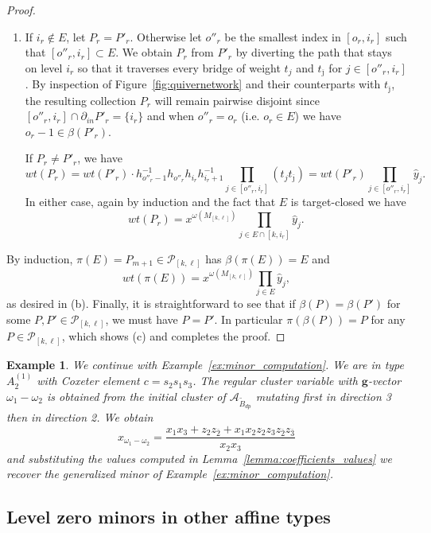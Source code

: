 \documentclass[12pt]{amsart}
\newcommand{\cA}{\mathcal{A}}
\newcommand{\bfg}{\mathbf{g}}
\newcommand{\gv}{\omega}
\newcommand{\grep}{\gv}
\newcommand{\cP}{\mathcal{P}}
\newcommand{\ol}[1]{\overline{#1}}
\newcommand{\Bdp}{\widetilde{B}_{dp}}
\newcommand{\Qrep}{M}
\newcommand{\cvar}{z}
\newtheorem{example}[theorem]{Example}
\theoremstyle{remark}
\numberwithin{equation}{section}
\numberwithin{figure}{section}
\begin{document}
\begin{proof}
\begin{enumerate}
    \item
      If $i_r \notin E$, let $P_r = P'_r$.
      Otherwise let $o''_r$ be the smallest index in $[o_r,i_r]$ such that $[o''_r,i_r]\subset E$.
      We obtain $P_r$ from $P'_r$ by diverting the path that stays on level $i_r$ so that it traverses every bridge of weight $t_j$ and $t_{\ol{\jmath}}$ for $j\in[o''_r,i_r]$.
      By inspection of Figure~\ref{fig:quivernetwork} and their counterparts with $t_{\ol{\jmath}}$, the resulting collection $P_r$ will remain pairwise disjoint since $[o''_r,i_r]\cap\partial_{in}P'_r=\{i_r\}$ and when $o''_r=o_r$ (i.e. $o_r\in E$) we have $o_r-1\in\beta(P'_r)$.

      If $P_r \neq P'_r$, we have
      \[
        wt(P_r)=wt(P'_r)\cdot h_{o''_r-1}^{-1}h_{o''_r}h_{i_r}h_{i_r+1}^{-1}\prod_{j\in[o''_r,i_r]}(t_jt_{\ol{\jmath}})=wt(P'_r)\prod_{j \in [o''_r,i_r]} \hat{y}_j.
      \]
      In either case, again by induction and the fact that $E$ is target-closed we have
      \[
        wt(P_r) = x^{\grep(\Qrep_{[k,\ell]})} \prod_{j \in E \cap [k,i_r]} \hat{y}_j.
      \]
  \end{enumerate}
  By induction, $\pi(E)=P_{m+1} \in \cP_{[k,\ell]}$ has $\beta(\pi(E))=E$ and
  \[
    wt(\pi(E))=x^{\grep(\Qrep_{[k,\ell]})}\prod_{j\in E}\hat y_j,
  \]
  as desired in (b).
  Finally, it is straightforward to see that if $\beta(P) = \beta(P')$ for some $P, P' \in \cP_{[k,\ell]}$, we must have $P = P'$.
  In particular $\pi(\beta(P))=P$ for any $P\in\cP_{[k,\ell]}$, which shows (c) and completes the proof.
\end{proof}
\begin{example}
  We continue with Example~\ref{ex:minor_computation}.
  We are in type $A_2^{(1)}$ with Coxeter element $c=s_2s_1s_3$.
  The regular cluster variable with $\bfg$-vector $\omega_1-\omega_2$ is obtained from the initial cluster of $\cA_{\Bdp}$ mutating first in direction 3 then in direction 2.
  We obtain
  \[
    x_{\omega_1-\omega_2} 
    =
    \frac{x_1 x_3 + \cvar_2 \cvar_{\ol{2}} + x_1 x_2 \cvar_2 \cvar_3 \cvar_{\ol{2}} \cvar_{\ol{3}}}{x_2 x_3}
  \]
  and substituting the values computed in Lemma~\ref{lemma:coefficients_values} we recover the generalized minor of Example~\ref{ex:minor_computation}.
\end{example}
\subsection{Level zero minors in other affine types}
\label{sec:othertypes}
\end{document}
